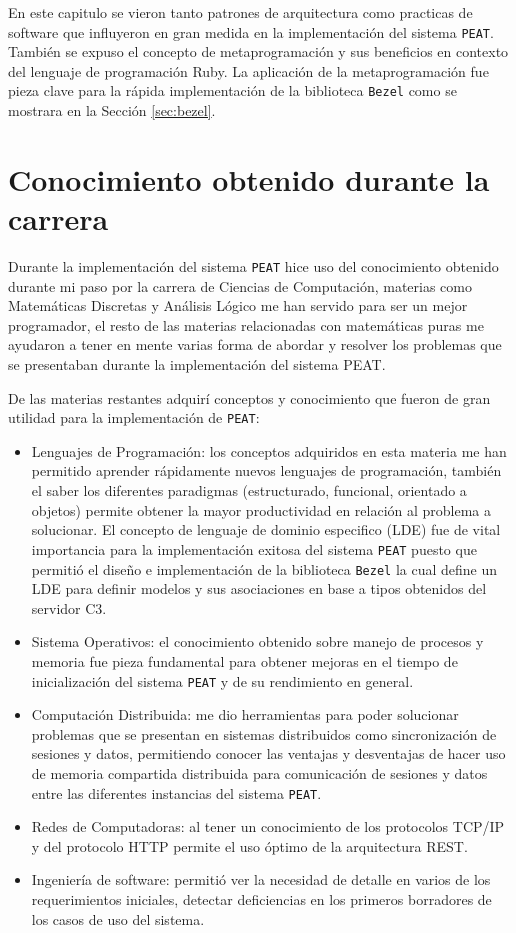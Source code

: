 En este capitulo se vieron tanto patrones de arquitectura como practicas de software
que influyeron en gran medida en la implementación del sistema \texttt{PEAT}.
También se expuso el concepto de metaprogramación y sus beneficios en contexto del
lenguaje de programación Ruby. La aplicación de la metaprogramación fue pieza clave
para la rápida implementación de la biblioteca \texttt{Bezel} como se mostrara en la
Sección \ref{sec:bezel}.

\section{Conocimiento obtenido durante la carrera}

Durante la implementación del sistema \texttt{PEAT} hice uso del conocimiento
obtenido durante mi paso por la carrera de Ciencias de Computación, materias
como Matemáticas Discretas y Análisis Lógico me han servido para ser un mejor
programador, el resto de las materias relacionadas con matemáticas puras me
ayudaron a tener en mente varias forma de abordar y resolver los problemas que se
presentaban durante la implementación del sistema PEAT.

De las materias restantes adquirí conceptos y conocimiento que fueron de gran
utilidad para la implementación de \texttt{PEAT}:

\begin{itemize}
\item Lenguajes de Programación: los conceptos adquiridos en esta materia me
  han permitido aprender rápidamente nuevos lenguajes de programación, también
  el saber los diferentes paradigmas (estructurado, funcional, orientado a objetos)
  permite obtener la mayor productividad en relación al problema a solucionar.
  El concepto de lenguaje de dominio especifico (LDE) fue de vital importancia para
  la implementación exitosa del sistema \texttt{PEAT} puesto que permitió el
  diseño e implementación de la biblioteca \texttt{Bezel} la cual define un LDE
  para definir modelos y sus asociaciones en base a tipos obtenidos del servidor C3.
\item Sistema Operativos: el conocimiento obtenido sobre manejo de procesos
  y memoria fue pieza fundamental para obtener mejoras en el tiempo de inicialización
  del sistema \texttt{PEAT} y de su rendimiento en general.
\item Computación Distribuida: me dio herramientas para poder solucionar problemas
  que se presentan en sistemas distribuidos como sincronización de sesiones y
  datos, permitiendo conocer las ventajas y desventajas de hacer uso de memoria
  compartida distribuida para comunicación de sesiones y datos entre las diferentes
  instancias del sistema \texttt{PEAT}.
\item Redes de Computadoras: al tener un conocimiento de los protocolos
  TCP/IP y del protocolo HTTP permite el uso óptimo de la arquitectura REST.
\item Ingeniería de software: permitió ver la necesidad de detalle en varios
  de los requerimientos iniciales, detectar deficiencias en los primeros
  borradores de los casos de uso del sistema.
\end{itemize}
